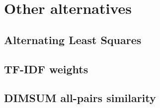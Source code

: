 \section{Other alternatives}

\subsection{Alternating Least Squares}

\subsection{TF-IDF weights}

\subsection{DIMSUM all-pairs similarity}